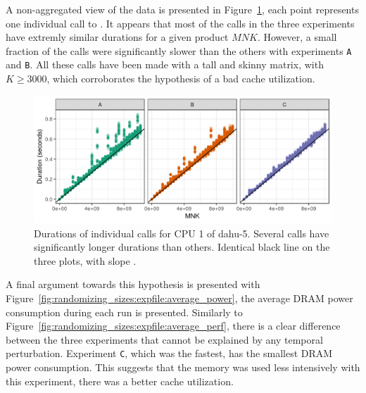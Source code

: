             A non-aggregated view of the data is presented in Figure~\ref{fig:randomizing_sizes:expfile:raw_data}, each
            point represents one individual call to \dgemm. It appears that most of the calls in the three experiments
            have extremly similar durations for a given product \(MNK\). However, a small fraction of the \dgemm calls
            were significantly slower than the others with experiments \texttt{A} and \texttt{B}. All these calls have
            been made with a tall and skinny matrix, with \(K\geq3000\), which corroborates the hypothesis of a bad
            cache utilization.

            \begin{figure}[htpb]
                \centering
                \includegraphics[width=\linewidth]{img/experiment/randomizing_sizes/expfile/raw_data.png}
                \caption{Durations of individual \dgemm calls for CPU 1 of dahu-5.
                Several calls have significantly longer durations than others. Identical black line on the three plots,
                with slope .}%
                \label{fig:randomizing_sizes:expfile:raw_data}
            \end{figure}

            A final argument towards this hypothesis is presented with
            Figure~\ref{fig:randomizing_sizes:expfile:average_power}, the average DRAM power consumption during each run
            is presented. Similarly to Figure~\ref{fig:randomizing_sizes:expfile:average_perf}, there is a clear
            difference between the three experiments that cannot be explained by any temporal perturbation. Experiment
            \texttt{C}, which was the fastest, has the smallest DRAM power consumption. This suggests that the memory
            was used less intensively with this experiment, \ie there was a better cache utilization.

